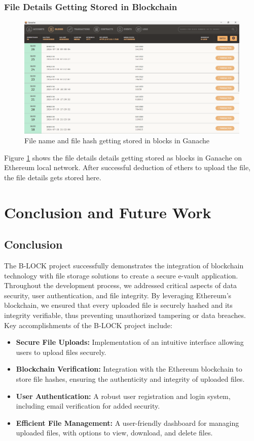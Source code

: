\documentclass[12pt,a4paper]{report}
\begin{document}
\subsection{File Details Getting Stored in Blockchain}
\begin{figure}[hbtp]
    \centering
    \includegraphics[scale=0.4]{./pic/ganache.png}
    \caption{File name and file hash getting stored in blocks in Ganache}
    \label{fig:ganache}
\end{figure}
Figure \ref{fig:ganache} shows the file details details getting stored as blocks in Ganache\cite{ganachedocs} on Ethereum\cite{ethereumdocs} local network. After successful deduction of ethers to upload the file, the file details gets stored here.


\chapter{Conclusion and Future Work}
\section{Conclusion}
The B-LOCK project successfully demonstrates the integration of blockchain technology with file storage solutions to create a secure e-vault application. Throughout the development process, we addressed critical aspects of data security, user authentication, and file integrity. By leveraging Ethereum's blockchain, we ensured that every uploaded file is securely hashed and its integrity verifiable, thus preventing unauthorized tampering or data breaches.
\\
Key accomplishments of the B-LOCK project include:
\begin{itemize}
\item \textbf{Secure File Uploads:} Implementation of an intuitive interface allowing users to upload files securely.
\item \textbf{Blockchain Verification:} Integration with the Ethereum blockchain to store file hashes, ensuring the authenticity and integrity of uploaded files.
\item \textbf{User Authentication:} A robust user registration and login system, including email verification for added security.
\item \textbf{Efficient File Management:} A user-friendly dashboard for managing uploaded files, with options to view, download, and delete files.

\end{itemize}
\end{document}

